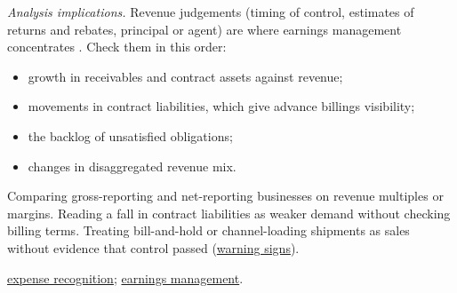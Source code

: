 \begin{qfmethod}
\emph{Analysis implications.} Revenue judgements (timing of control, estimates of returns and rebates, principal or agent) are where earnings management concentrates \citep[pp.~110--111]{financial-statement-analysis-2009}. Check them in this order:
\begin{itemize}
\item growth in receivables and contract assets against revenue;
\item movements in contract liabilities, which give advance billings visibility;
\item the backlog of unsatisfied obligations;
\item changes in disaggregated revenue mix.
\end{itemize}

 Comparing gross-reporting and net-reporting businesses on revenue multiples or margins. Reading a fall in contract liabilities as weaker demand without checking billing terms. Treating bill-and-hold or channel-loading shipments as sales without evidence that control passed (\hyperref[meth:reporting-warning-signs]{warning signs}).

 \hyperref[meth:expense-recognition-capitalisation]{expense recognition}; \hyperref[meth:earnings-management-presentation]{earnings management}.

\end{qfmethod}

